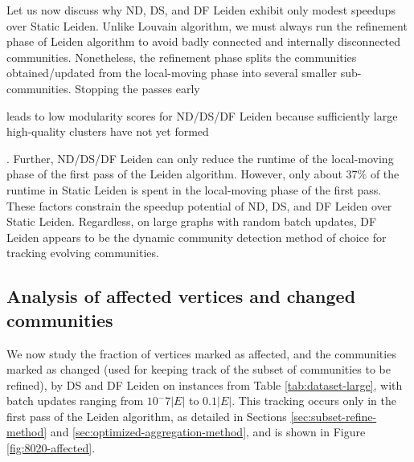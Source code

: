 Let us now discuss why ND, DS, and DF Leiden exhibit only modest speedups over Static Leiden. Unlike Louvain algorithm, we must always run the refinement phase of Leiden algorithm to avoid badly connected and internally disconnected communities. Nonetheless, the refinement phase splits the communities obtained/updated from the local-moving phase into several smaller sub-communities. Stopping the passes early leads to low modularity scores for ND/DS/DF Leiden because sufficiently large high-quality clusters have not yet formed. Further, ND/DS/DF Leiden can only reduce the runtime of the local-moving phase of the first pass of the Leiden algorithm. However, only about $37\%$ of the runtime in Static Leiden is spent in the local-moving phase of the first pass. These factors constrain the speedup potential of ND, DS, and DF Leiden over Static Leiden. Regardless, on large graphs with random batch updates, DF Leiden appears to be the dynamic community detection method of choice for tracking evolving communities.





\subsection{Analysis of affected vertices and changed communities}

We now study the fraction of vertices marked as affected, and the communities marked as changed (used for keeping track of the subset of communities to be refined), by DS and DF Leiden on instances from Table \ref{tab:dataset-large}, with batch updates ranging from $10^-7|E|$ to $0.1|E|$. This tracking occurs only in the first pass of the Leiden algorithm, as detailed in Sections \ref{sec:subset-refine-method} and \ref{sec:optimized-aggregation-method}, and is shown in Figure \ref{fig:8020-affected}.

